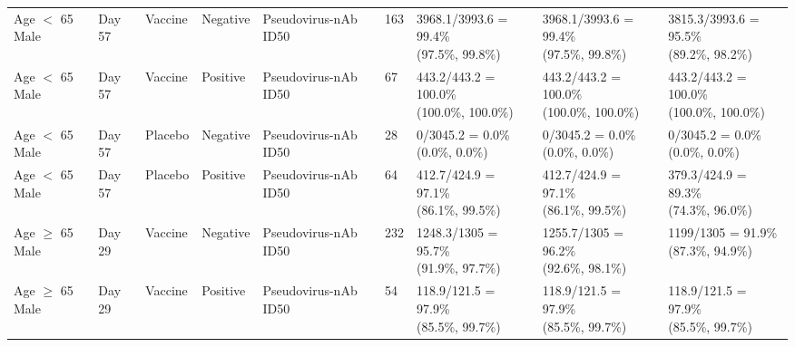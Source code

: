 \documentclass[]{book}
\theoremstyle{definition}
\theoremstyle{definition}
\theoremstyle{definition}
\newcommand{\1}{\mathbbm{1}}
\begin{document}
\begin{landscape}
\begin{ThreePartTable}
\begin{longtable}[t]{>{\raggedright\arraybackslash}p{2.7cm}llllllll}
\hspace{1em}Age $<$ 65 Male & Day 57 & Vaccine & Negative & Pseudovirus-nAb ID50 & 163 & \makecell[l]{3968.1/3993.6 = 99.4\%\\(97.5\%, 99.8\%)} & \makecell[l]{3968.1/3993.6 = 99.4\%\\(97.5\%, 99.8\%)} & \makecell[l]{3815.3/3993.6 = 95.5\%\\(89.2\%, 98.2\%)}\\
\hspace{1em}Age $<$ 65 Male & Day 57 & Vaccine & Positive & Pseudovirus-nAb ID50 & 67 & \makecell[l]{443.2/443.2 = 100.0\%\\(100.0\%, 100.0\%)} & \makecell[l]{443.2/443.2 = 100.0\%\\(100.0\%, 100.0\%)} & \makecell[l]{443.2/443.2 = 100.0\%\\(100.0\%, 100.0\%)}\\
\hspace{1em}Age $<$ 65 Male & Day 57 & Placebo & Negative & Pseudovirus-nAb ID50 & 28 & \makecell[l]{0/3045.2 = 0.0\%\\(0.0\%, 0.0\%)} & \makecell[l]{0/3045.2 = 0.0\%\\(0.0\%, 0.0\%)} & \makecell[l]{0/3045.2 = 0.0\%\\(0.0\%, 0.0\%)}\\
\hspace{1em}Age $<$ 65 Male & Day 57 & Placebo & Positive & Pseudovirus-nAb ID50 & 64 & \makecell[l]{412.7/424.9 = 97.1\%\\(86.1\%, 99.5\%)} & \makecell[l]{412.7/424.9 = 97.1\%\\(86.1\%, 99.5\%)} & \makecell[l]{379.3/424.9 = 89.3\%\\(74.3\%, 96.0\%)}\\
\hspace{1em}Age $\geq$ 65 Male & Day 29 & Vaccine & Negative & Pseudovirus-nAb ID50 & 232 & \makecell[l]{1248.3/1305 = 95.7\%\\(91.9\%, 97.7\%)} & \makecell[l]{1255.7/1305 = 96.2\%\\(92.6\%, 98.1\%)} & \makecell[l]{1199/1305 = 91.9\%\\(87.3\%, 94.9\%)}\\
\hspace{1em}Age $\geq$ 65 Male & Day 29 & Vaccine & Positive & Pseudovirus-nAb ID50 & 54 & \makecell[l]{118.9/121.5 = 97.9\%\\(85.5\%, 99.7\%)} & \makecell[l]{118.9/121.5 = 97.9\%\\(85.5\%, 99.7\%)} & \makecell[l]{118.9/121.5 = 97.9\%\\(85.5\%, 99.7\%)}\\

\end{longtable}
\end{ThreePartTable}
\end{landscape}
\end{document}
